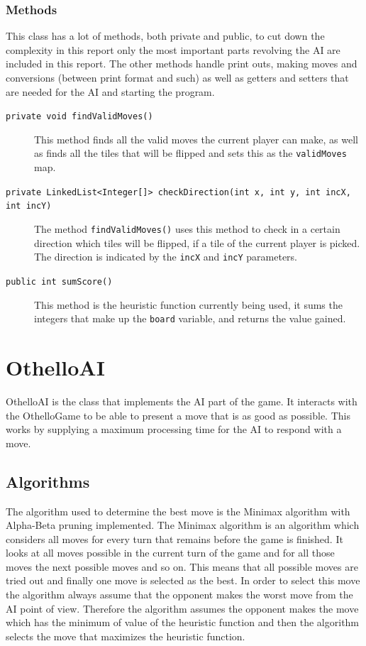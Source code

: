 \documentclass[a4paper]{article}
\begin{document}
\subsubsection{Methods}
This class has a lot of methods, both private and public, to cut down the complexity in this report only the most important parts revolving the AI are included in this report. The other methods handle print outs, making moves and conversions (between print format and such) as well as getters and setters that are needed for the AI and starting the program.  
\begin{description}
\item[\texttt{private void findValidMoves()}] This method finds all the valid moves the current player can make, as well as finds all the tiles that will be flipped and sets this as the \texttt{validMoves} map.
\item[\texttt{private LinkedList<Integer[]> checkDirection(int x, int y, int incX, int incY)}] The method \texttt{findValidMoves()} uses this method to check in a certain direction which tiles will be flipped, if a tile of the current player is picked. The direction is indicated by the \texttt{incX} and \texttt{incY} parameters.
\item[\texttt{public int sumScore()}] This method is the heuristic function currently being used, it sums the integers that make up the \texttt{board} variable, and returns the value gained.
\end{description} 

\section{OthelloAI}
OthelloAI is the class that implements the AI part of the game. It interacts with the OthelloGame to be able to present a move that is as good as possible. This works by supplying a maximum processing time for the AI to respond with a move. 

\subsection{Algorithms}
The algorithm used to determine the best move is the Minimax algorithm with Alpha-Beta pruning implemented. The Minimax algorithm is an algorithm which considers all moves for every turn that remains before the game is finished. It looks at all moves possible in the current turn of the game and for all those moves the next possible moves and so on. This means that all possible moves are tried out and finally one move is selected as the best. In order to select this move the algorithm always assume that the opponent makes the worst move from the AI point of view. Therefore the algorithm assumes the opponent makes the move which has the minimum of value of the heuristic function and then the algorithm selects the move that maximizes the heuristic function.
\end{document}
